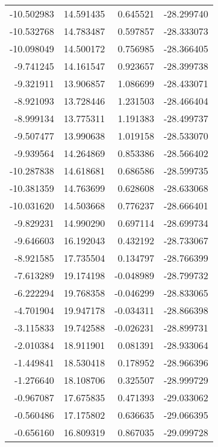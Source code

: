 \begin{tabular}{rrrr}
      -10.502983 &        14.591435 &    0.645521 & -28.299740 \\
      -10.532768 &        14.783487 &    0.597857 & -28.333073 \\
      -10.098049 &        14.500172 &    0.756985 & -28.366405 \\
       -9.741245 &        14.161547 &    0.923657 & -28.399738 \\
       -9.321911 &        13.906857 &    1.086699 & -28.433071 \\
       -8.921093 &        13.728446 &    1.231503 & -28.466404 \\
       -8.999134 &        13.775311 &    1.191383 & -28.499737 \\
       -9.507477 &        13.990638 &    1.019158 & -28.533070 \\
       -9.939564 &        14.264869 &    0.853386 & -28.566402 \\
      -10.287838 &        14.618681 &    0.686586 & -28.599735 \\
      -10.381359 &        14.763699 &    0.628608 & -28.633068 \\
      -10.031620 &        14.503668 &    0.776237 & -28.666401 \\
       -9.829231 &        14.990290 &    0.697114 & -28.699734 \\
       -9.646603 &        16.192043 &    0.432192 & -28.733067 \\
       -8.921585 &        17.735504 &    0.134797 & -28.766399 \\
       -7.613289 &        19.174198 &   -0.048989 & -28.799732 \\
       -6.222294 &        19.768358 &   -0.046299 & -28.833065 \\
       -4.701904 &        19.947178 &   -0.034311 & -28.866398 \\
       -3.115833 &        19.742588 &   -0.026231 & -28.899731 \\
       -2.010384 &        18.911901 &    0.081391 & -28.933064 \\
       -1.449841 &        18.530418 &    0.178952 & -28.966396 \\
       -1.276640 &        18.108706 &    0.325507 & -28.999729 \\
       -0.967087 &        17.675835 &    0.471393 & -29.033062 \\
       -0.560486 &        17.175802 &    0.636635 & -29.066395 \\
       -0.656160 &        16.809319 &    0.867035 & -29.099728 \\

\end{tabular}
